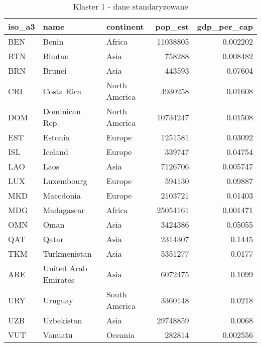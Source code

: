 \begin{table}[h!]
    \centering
    \caption{Klaster 1 - dane standaryzowane}
    \label{tab:cl1std}
    \begin{tabular}{lllrr}
        \toprule
        iso\_a3 & name                 & continent     & pop\_est & gdp\_per\_cap \\
        \midrule
        BEN     & Benin                & Africa        & 11038805 & 0.002202      \\
        BTN     & Bhutan               & Asia          & 758288   & 0.008482      \\
        BRN     & Brunei               & Asia          & 443593   & 0.07604       \\
        CRI     & Costa Rica           & North America & 4930258  & 0.01608       \\
        DOM     & Dominican Rep.       & North America & 10734247 & 0.01508       \\
        EST     & Estonia              & Europe        & 1251581  & 0.03092       \\
        ISL     & Iceland              & Europe        & 339747   & 0.04754       \\
        LAO     & Laos                 & Asia          & 7126706  & 0.005747      \\
        LUX     & Luxembourg           & Europe        & 594130   & 0.09887       \\
        MKD     & Macedonia            & Europe        & 2103721  & 0.01403       \\
        MDG     & Madagascar           & Africa        & 25054161 & 0.001471      \\
        OMN     & Oman                 & Asia          & 3424386  & 0.05055       \\
        QAT     & Qatar                & Asia          & 2314307  & 0.1445        \\
        TKM     & Turkmenistan         & Asia          & 5351277  & 0.0177        \\
        ARE     & United Arab Emirates & Asia          & 6072475  & 0.1099        \\
        URY     & Uruguay              & South America & 3360148  & 0.0218        \\
        UZB     & Uzbekistan           & Asia          & 29748859 & 0.0068        \\
        VUT     & Vanuatu              & Oceania       & 282814   & 0.002556      \\
        \bottomrule
    \end{tabular}
\end{table}
